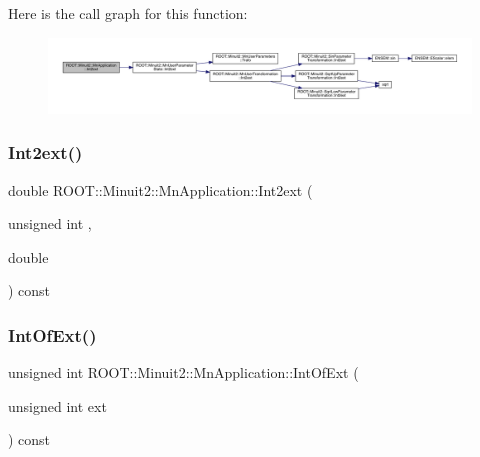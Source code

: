 Here is the call graph for this function\+:\nopagebreak
\begin{figure}[H]
\begin{center}
\leavevmode
\includegraphics[width=350pt]{df/dd5/classROOT_1_1Minuit2_1_1MnApplication_a1ca8337823e271c40f05f6da6ea8e231_cgraph}
\end{center}
\end{figure}
\mbox{\label{classROOT_1_1Minuit2_1_1MnApplication_a1ca8337823e271c40f05f6da6ea8e231}} 
\subsubsection{\texorpdfstring{Int2ext()}{Int2ext()}\hspace{0.1cm}{\footnotesize\ttfamily [2/2]}}
{\footnotesize\ttfamily double R\+O\+O\+T\+::\+Minuit2\+::\+Mn\+Application\+::\+Int2ext (\begin{DoxyParamCaption}\item[{unsigned int}]{,  }\item[{double}]{ }\end{DoxyParamCaption}) const}

\mbox{\label{classROOT_1_1Minuit2_1_1MnApplication_a7911389abce948da10dd82a8a172afd5}} 
\subsubsection{\texorpdfstring{IntOfExt()}{IntOfExt()}\hspace{0.1cm}{\footnotesize\ttfamily [1/2]}}
{\footnotesize\ttfamily unsigned int R\+O\+O\+T\+::\+Minuit2\+::\+Mn\+Application\+::\+Int\+Of\+Ext (\begin{DoxyParamCaption}\item[{unsigned int}]{ext }\end{DoxyParamCaption}) const}

